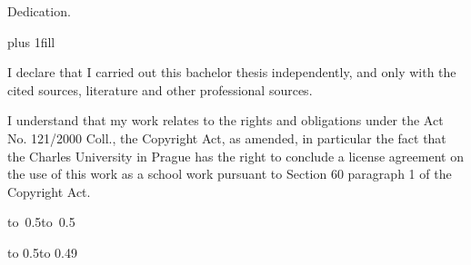 \documentclass[12pt,a4paper]{report}
\let\openright=\clearpage
\begin{document}
\openright

\noindent
Dedication.

\newpage


\vglue 0pt plus 1fill

\noindent
I declare that I carried out this bachelor thesis independently, and only with the cited
sources, literature and other professional sources.

\medskip\noindent
I understand that my work relates to the rights and obligations under the Act No.
121/2000 Coll., the Copyright Act, as amended, in particular the fact that the Charles
University in Prague has the right to conclude a license agreement on the use of this
work as a school work pursuant to Section 60 paragraph 1 of the Copyright Act.

\vspace{10mm}

\hbox{\hbox to 0.5\hbox to 0.5}

\vspace{20mm}
\newpage


\vbox to 0.5\nobreak\vbox to 0.49
\end{document}
